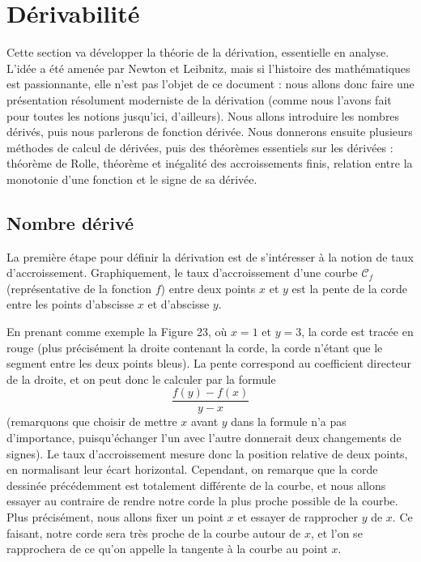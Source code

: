 \section{Dérivabilité}

Cette section va développer la théorie de la dérivation, essentielle en analyse. L'idée a été amenée par Newton et Leibnitz, mais si l'histoire des mathématiques est passionnante, elle n'est pas l'objet de ce document : nous allons donc faire une présentation résolument moderniste de la dérivation (comme nous l'avons fait pour toutes les notions jusqu'ici, d'ailleurs). Nous allons introduire les nombres dérivés, puis nous parlerons de fonction dérivée. Nous donnerons ensuite plusieurs méthodes de calcul de dérivées, puis des théorèmes essentiels sur les dérivées : théorème de Rolle, théorème et inégalité des accroissements finis, relation entre la monotonie d'une fonction et le signe de sa dérivée.

\subsection{Nombre dérivé}

La première étape pour définir la dérivation est de s'intéresser à la notion de taux d'accroissement. Graphiquement, le taux d'accroissement d'une courbe $\mathcal C_f$ (représentative de la fonction $f$) entre deux points $x$ et $y$ est la pente de la corde entre les points d'abscisse $x$ et d'abscisse $y$.


 En prenant comme exemple la Figure 23, où $x = 1$ et $y = 3$, la corde est tracée en rouge (plus précisément la droite contenant la corde, la corde n'étant que le segment entre les deux points bleus). La pente correspond au coefficient directeur de la droite, et on peut donc le calculer par la formule $$\frac{f(y)-f(x)}{y-x}$$ (remarquons que choisir de mettre $x$ avant $y$ dans la formule n'a pas d'importance, puisqu'échanger l'un avec l'autre donnerait deux changements de signes). Le taux d'accroissement mesure donc la position relative de deux points, en normalisant leur écart horizontal. Cependant, on remarque que la corde dessinée précédemment est totalement différente de la courbe, et nous allons essayer au contraire de rendre notre corde la plus proche possible de la courbe. Plus précisément, nous allons fixer un point $x$ et essayer de rapprocher $y$ de $x$. Ce faisant, notre corde sera très proche de la courbe autour de $x$, et l'on se rapprochera de ce qu'on appelle la tangente à la courbe au point $x$.

